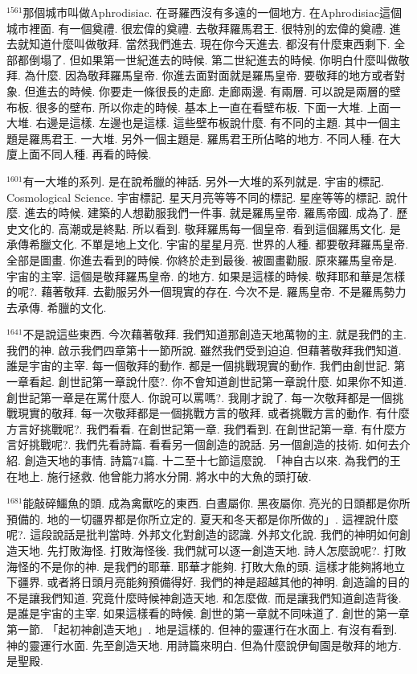 \documentclass{book}
\begin{document}
$^{1561}$那個城市叫做Aphrodisiac.
在哥羅西沒有多遠的一個地方.
在Aphrodisiac這個城市裡面.
有一個奠禮.
很宏偉的奠禮.
去敬拜羅馬君王.
很特別的宏偉的奠禮.
進去就知道什麼叫做敬拜.
當然我們進去.
現在你今天進去.
都沒有什麼東西剩下.
全部都倒塌了.
但如果第一世紀進去的時候.
第二世紀進去的時候.
你明白什麼叫做敬拜.
為什麼.
因為敬拜羅馬皇帝.
你進去面對面就是羅馬皇帝.
要敬拜的地方或者對象.
但進去的時候.
你要走一條很長的走廊.
走廊兩邊.
有兩層.
可以說是兩層的壁布板.
很多的壁布.
所以你走的時候.
基本上一直在看壁布板.
下面一大堆.
上面一大堆.
右邊是這樣.
左邊也是這樣.
這些壁布板說什麼.
有不同的主題.
其中一個主題是羅馬君王.
一大堆.
另外一個主題是.
羅馬君王所佔略的地方.
不同人種.
在大廈上面不同人種.
再看的時候.

$^{1601}$有一大堆的系列.
是在說希臘的神話.
另外一大堆的系列就是.
宇宙的標記.
Cosmological Science.
宇宙標記.
星天月亮等等不同的標記.
星座等等的標記.
說什麼.
進去的時候.
建築的人想勸服我們一件事.
就是羅馬皇帝.
羅馬帝國.
成為了.
歷史文化的.
高潮或是終點.
所以看到.
敬拜羅馬每一個皇帝.
看到這個羅馬文化.
是承傳希臘文化.
不單是地上文化.
宇宙的星星月亮.
世界的人種.
都要敬拜羅馬皇帝.
全部是圖畫.
你進去看到的時候.
你終於走到最後.
被圖畫勸服.
原來羅馬皇帝是.
宇宙的主宰.
這個是敬拜羅馬皇帝.
的地方.
如果是這樣的時候.
敬拜耶和華是怎樣的呢?.
藉著敬拜.
去勸服另外一個現實的存在.
今次不是.
羅馬皇帝.
不是羅馬勢力去承傳.
希臘的文化.

$^{1641}$不是說這些東西.
今次藉著敬拜.
我們知道那創造天地萬物的主.
就是我們的主.
我們的神.
啟示我們四章第十一節所說.
雖然我們受到迫迫.
但藉著敬拜我們知道.
誰是宇宙的主宰.
每一個敬拜的動作.
都是一個挑戰現實的動作.
我們由創世記.
第一章看起.
創世記第一章說什麼?.
你不會知道創世記第一章說什麼.
如果你不知道.
創世記第一章是在罵什麼人.
你說可以罵嗎?.
我剛才說了.
每一次敬拜都是一個挑戰現實的敬拜.
每一次敬拜都是一個挑戰方言的敬拜.
或者挑戰方言的動作.
有什麼方言好挑戰呢?.
我們看看.
在創世記第一章.
我們看到.
在創世記第一章.
有什麼方言好挑戰呢?.
我們先看詩篇.
看看另一個創造的說話.
另一個創造的技術.
如何去介紹.
創造天地的事情.
詩篇74篇.
十二至十七節這麼說.
「神自古以來.
為我們的王在地上.
施行拯救.
他曾能力將水分開.
將水中的大魚的頭打破.

$^{1681}$能敲碎鱷魚的頭.
成為禽獸吃的東西.
白晝屬你.
黑夜屬你.
亮光的日頭都是你所預備的.
地的一切疆界都是你所立定的.
夏天和冬天都是你所做的」.
這裡說什麼呢?.
這段說話是批判當時.
外邦文化對創造的認識.
外邦文化說.
我們的神明如何創造天地.
先打敗海怪.
打敗海怪後.
我們就可以逐一創造天地.
詩人怎麼說呢?.
打敗海怪的不是你的神.
是我們的耶華.
耶華才能夠.
打敗大魚的頭.
這樣才能夠將地立下疆界.
或者將日頭月亮能夠預備得好.
我們的神是超越其他的神明.
創造論的目的不是讓我們知道.
究竟什麼時候神創造天地.
和怎麼做.
而是讓我們知道創造背後.
是誰是宇宙的主宰.
如果這樣看的時候.
創世的第一章就不同味道了.
創世的第一章第一節.
「起初神創造天地」.
地是這樣的.
但神的靈運行在水面上.
有沒有看到.
神的靈運行水面.
先至創造天地.
用詩篇來明白.
但為什麼說伊甸園是敬拜的地方.
是聖殿.
\end{document}
